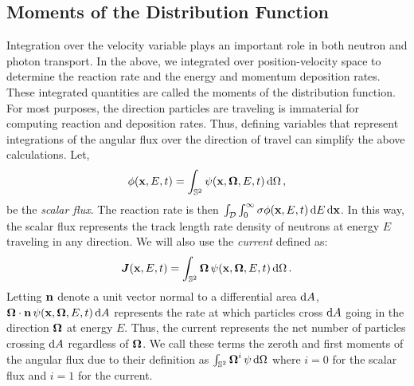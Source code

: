 \documentclass[../doc.tex]{subfiles}
\begin{document}
\subsection{Moments of the Distribution Function}
Integration over the velocity variable plays an important role in both neutron and photon transport. In the above, we integrated over position-velocity space to determine the reaction rate and the energy and momentum deposition rates. These integrated quantities are called the moments of the distribution function. 
For most purposes, the direction particles are traveling is immaterial for computing reaction and deposition rates. Thus, defining variables that represent integrations of the angular flux over the direction of travel can simplify the above calculations. Let, 
	\begin{equation}
		\phi(\boldsymbol{\mathrm{x}},E,t) = \int_{\mathbb{S}^2} \psi(\boldsymbol{\mathrm{x}},\boldsymbol{\Omega},E,t) \mathop{}\!\mathrm{d} \Omega \,,  
	\end{equation}
be the \emph{scalar flux}. The reaction rate is then $\int_{\mathcal{D}} \int_0^\infty \sigma \phi(\boldsymbol{\mathrm{x}},E,t) \mathop{}\!\mathrm{d} E \mathop{}\!\mathrm{d} \boldsymbol{\mathrm{x}}$. In this way, the scalar flux represents the track length rate density of neutrons at energy $E$ traveling in any direction.
We will also use the \emph{current} defined as: 
	\begin{equation}
		\boldsymbol{J}(\boldsymbol{\mathrm{x}},E,t) = \int_{\mathbb{S}^2} \boldsymbol{\Omega}\,\psi(\boldsymbol{\mathrm{x}},\boldsymbol{\Omega},E,t) \mathop{}\!\mathrm{d} \Omega \,. 
	\end{equation}
Letting $\boldsymbol{\mathrm{n}}$ denote a unit vector normal to a differential area $\mathop{}\!\mathrm{d} A$, $\boldsymbol{\Omega}\cdot\boldsymbol{\mathrm{n}}\,\psi(\boldsymbol{\mathrm{x}},\boldsymbol{\Omega},E,t) \mathop{}\!\mathrm{d} A$ represents the rate at which particles cross $\mathop{}\!\mathrm{d} A$ going in the direction $\boldsymbol{\Omega}$ at energy $E$. Thus, the current represents the net number of particles crossing $\mathop{}\!\mathrm{d} A$ regardless of $\boldsymbol{\Omega}$. We call these terms the zeroth and first moments of the angular flux due to their definition as $\int_{\mathbb{S}^2} \boldsymbol{\Omega}^i\,\psi \mathop{}\!\mathrm{d} \Omega$ where $i=0$ for the scalar flux and $i=1$ for the current. 
\end{document}
